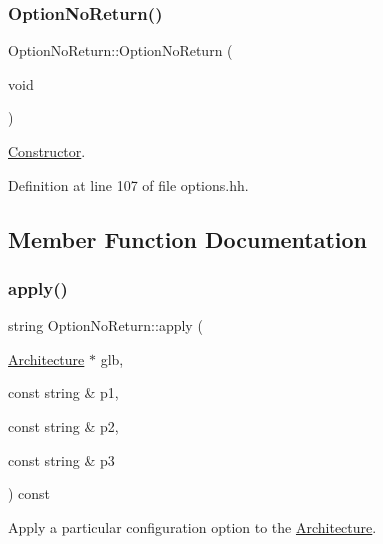 \subsubsection{\texorpdfstring{OptionNoReturn()}{OptionNoReturn()}}
{\footnotesize\ttfamily Option\+No\+Return\+::\+Option\+No\+Return (\begin{DoxyParamCaption}\item[{void}]{ }\end{DoxyParamCaption})\hspace{0.3cm}{\ttfamily [inline]}}



\mbox{\hyperlink{class_constructor}{Constructor}}. 



Definition at line 107 of file options.\+hh.



\subsection{Member Function Documentation}
\mbox{\label{class_option_no_return_af92ab261861bf699b5ac1f775fc5029d}} 
\subsubsection{\texorpdfstring{apply()}{apply()}}
{\footnotesize\ttfamily string Option\+No\+Return\+::apply (\begin{DoxyParamCaption}\item[{\mbox{\hyperlink{class_architecture}{Architecture}} $\ast$}]{glb,  }\item[{const string \&}]{p1,  }\item[{const string \&}]{p2,  }\item[{const string \&}]{p3 }\end{DoxyParamCaption}) const\hspace{0.3cm}{\ttfamily [virtual]}}



Apply a particular configuration option to the \mbox{\hyperlink{class_architecture}{Architecture}}. 

